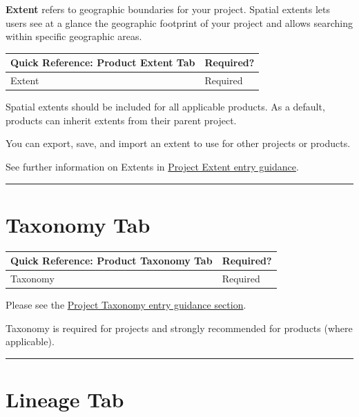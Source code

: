 \documentclass[
]{book}
\makeatletter
\newenvironment{kframe}{%
\medskip{}
\setlength{\fboxsep}{.8em}
 \def\at@end@of@kframe{}%
 \ifinner\ifhmode%
  \def\at@end@of@kframe{\end{minipage}}%
  \begin{minipage}{\columnwidth}%
 \fi\fi%
 \def\FrameCommand##1{\hskip\@totalleftmargin \hskip-\fboxsep
 \colorbox{shadecolor}{##1}\hskip-\fboxsep
     \hskip-\linewidth \hskip-\@totalleftmargin \hskip\columnwidth}%
 \MakeFramed {\advance\hsize-\width
   \@totalleftmargin\z@ \linewidth\hsize
   \@setminipage}}%
 {\par\unskip\endMakeFramed%
 \at@end@of@kframe}
\newenvironment{rmdblock}[1]
  {
  \begin{itemize}
  \renewcommand{\labelitemi}{
    \raisebox{-.7\height}[0pt][0pt]{
      {\setkeys{Gin}{width=3em,keepaspectratio}\texttt{[image: images/\#1]}}
    }
  }
  \setlength{\fboxsep}{1em}
  \begin{kframe}
  \item
  }
  {
  \end{kframe}
  \end{itemize}
  }
\newenvironment{rmdtip}
  {\begin{rmdblock}{tip}}
  {\end{rmdblock}}
\makeatother
\begin{document}
\textbf{Extent} refers to geographic boundaries for your project. Spatial extents lets users see at a glance the geographic footprint of your project and allows searching within specific geographic areas.

\begin{longtable}[]{@{}ll@{}}
\toprule
Quick Reference: Product Extent Tab & Required?\tabularnewline
\midrule
\endhead
Extent & Required\tabularnewline
\bottomrule
\end{longtable}

Spatial extents should be included for all applicable products. As a default, products can inherit extents from their parent project.

\begin{rmdtip}
You can export, save, and import an extent to use for other projects or
products.
\end{rmdtip}

See further information on Extents in \protect\hyperlink{project-extent}{Project Extent entry guidance}.

\begin{center}\rule{0.5\linewidth}{\linethickness}\end{center}

\hypertarget{product-taxonomy}{%
\section{Taxonomy Tab}\label{product-taxonomy}}

\begin{longtable}[]{@{}ll@{}}
\toprule
Quick Reference: Product Taxonomy Tab & Required?\tabularnewline
\midrule
\endhead
Taxonomy & Required\tabularnewline
\bottomrule
\end{longtable}

Please see the \protect\hyperlink{project-taxonomy}{Project Taxonomy entry guidance section}.

Taxonomy is required for projects and strongly recommended for products (where applicable).

\begin{center}\rule{0.5\linewidth}{\linethickness}\end{center}

\hypertarget{product-lineage}{%
\section{Lineage Tab}\label{product-lineage}}
\end{document}
